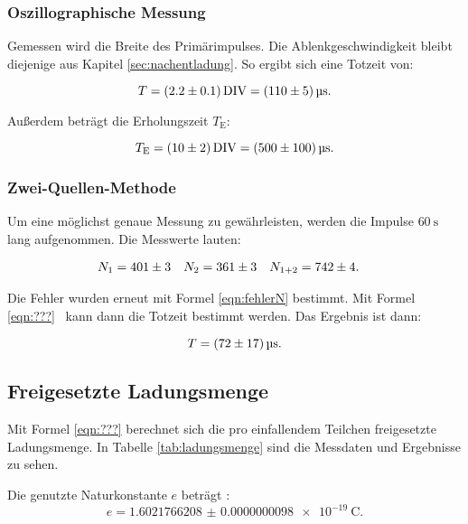 \subsubsection{Oszillographische Messung}

Gemessen wird die Breite des Primärimpulses. Die Ablenkgeschwindigkeit bleibt diejenige aus
Kapitel \ref{sec:nachentladung}.
So ergibt sich eine Totzeit von:

\begin{equation*}
  T = \SI{2.2+-0.1}{\text{DIV}} = \SI{110+-5}{\micro\second}.
\end{equation*}

Außerdem beträgt die Erholungszeit $T_\text{E}$:

\begin{equation*}
  T_\text{E} = \SI{10+-2}{\text{DIV}} = \SI{500+-100}{\micro\second}.
\end{equation*}

\subsubsection{Zwei-Quellen-Methode}

Um eine möglichst genaue Messung zu gewährleisten, werden die Impulse $\SI{60}{\second}$ lang
aufgenommen. Die Messwerte lauten:

\begin{align*}
  N_1 &= \num{401+-3} & N_2 &= \num{361+-3} & N_{1+2} &= \num{742+-4}.
\end{align*}

Die Fehler wurden erneut mit Formel \eqref{eqn:fehlerN} bestimmt. Mit Formel \eqref{eqn:???}%
~kann dann die Totzeit bestimmt werden. Das Ergebnis ist dann:

\begin{equation*}
  T = \SI{72+-17}{\micro\second}.
\end{equation*}

\subsection{Freigesetzte Ladungsmenge}

Mit Formel \eqref{eqn:???}%
berechnet sich die pro einfallendem Teilchen freigesetzte Ladungsmenge.
In Tabelle \ref{tab:ladungsmenge} sind die Messdaten und Ergebnisse zu sehen.

Die genutzte Naturkonstante $\si{\elementarycharge}$ beträgt \cite{codata}:
\begin{equation}
  \si{\elementarycharge} =  \SI{1.6021766208(98)e-19}{\coulomb}.
\end{equation}

